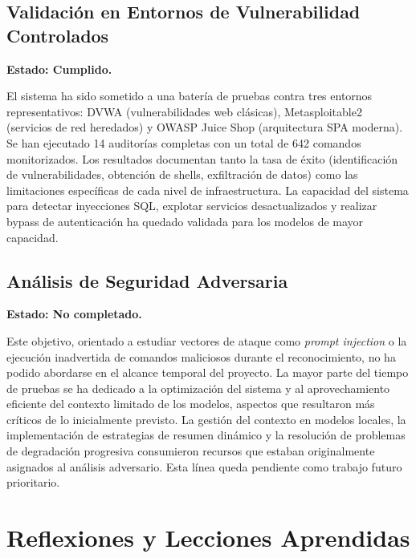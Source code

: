 \subsection{Validación en Entornos de Vulnerabilidad Controlados}

\textbf{Estado: Cumplido.}

El sistema ha sido sometido a una batería de pruebas contra tres entornos representativos: DVWA (vulnerabilidades web clásicas), Metasploitable2 (servicios de red heredados) y OWASP Juice Shop (arquitectura SPA moderna). Se han ejecutado 14 auditorías completas con un total de 642 comandos monitorizados. Los resultados documentan tanto la tasa de éxito (identificación de vulnerabilidades, obtención de shells, exfiltración de datos) como las limitaciones específicas de cada nivel de infraestructura. La capacidad del sistema para detectar inyecciones SQL, explotar servicios desactualizados y realizar bypass de autenticación ha quedado validada para los modelos de mayor capacidad.

\subsection{Análisis de Seguridad Adversaria}

\textbf{Estado: No completado.}

Este objetivo, orientado a estudiar vectores de ataque como \textit{prompt injection} o la ejecución inadvertida de comandos maliciosos durante el reconocimiento, no ha podido abordarse en el alcance temporal del proyecto. La mayor parte del tiempo de pruebas se ha dedicado a la optimización del sistema y al aprovechamiento eficiente del contexto limitado de los modelos, aspectos que resultaron más críticos de lo inicialmente previsto. La gestión del contexto en modelos locales, la implementación de estrategias de resumen dinámico y la resolución de problemas de degradación progresiva consumieron recursos que estaban originalmente asignados al análisis adversario. Esta línea queda pendiente como trabajo futuro prioritario.


\section{Reflexiones y Lecciones Aprendidas}
\label{sec:reflexiones}

